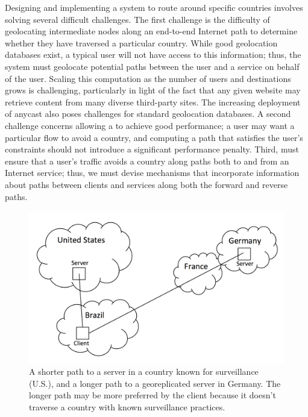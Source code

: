 Designing and implementing a system to route around specific countries
involves solving several difficult challenges. The first challenge is
the difficulty of geolocating intermediate nodes along an end-to-end
Internet path to determine whether they have traversed a particular
country. While good geolocation databases exist, a typical user will not
have access to this information; thus, the system must geolocate
potential paths between the user and a service on behalf of the
user. Scaling this computation as the number of users and destinations grows
is challenging, particularly in light of the fact that any given website
may retrieve content from many diverse third-party sites. The increasing
deployment of anycast also poses challenges for standard geolocation
databases.    A
second challenge concerns allowing a \system{} to achieve good
performance; a user may want a particular flow to avoid a country, and
computing a path that satisfies the user's constraints should not
introduce a significant performance penalty. Third, \system{} must
ensure that a user's traffic avoids a country along paths both to and
from an Internet service; thus, we must devise mechanisms that
incorporate information about paths between clients and services along
both the forward and reverse paths.



\begin{figure}[t]
\centering
\includegraphics[width=.5\textwidth]{intro_fig}
\caption{A shorter path to a server in a country known for surveillance (U.S.), and a longer path to a georeplicated server in Germany.  The longer path may be more preferred by the client because it doesn't traverse a country with known surveillance practices.}
\label{fig:intro}
\end{figure}

